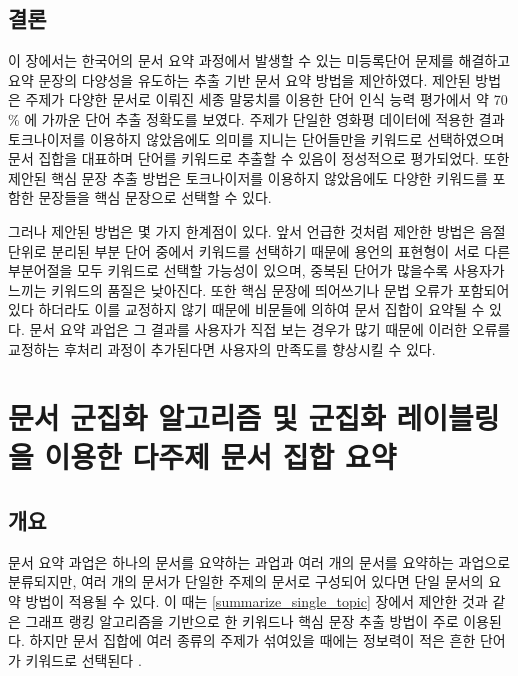 \documentclass[11pt]{article}
\begin{document}
\subsection{결론}

이 장에서는 한국어의 문서 요약 과정에서 발생할 수 있는 미등록단어 문제를 해결하고 요약 문장의 다양성을 유도하는 추출 기반 문서 요약 방법을 제안하였다.
제안된 방법은 주제가 다양한 문서로 이뤄진 세종 말뭉치를 이용한 단어 인식 능력 평가에서 약 70 \% 에 가까운 단어 추출 정확도를 보였다.
주제가 단일한 영화평 데이터에 적용한 결과 토크나이저를 이용하지 않았음에도 의미를 지니는 단어들만을 키워드로 선택하였으며 문서 집합을 대표하며 단어를 키워드로 추출할 수 있음이 정성적으로 평가되었다.
또한 제안된 핵심 문장 추출 방법은 토크나이저를 이용하지 않았음에도 다양한 키워드를 포함한 문장들을 핵심 문장으로 선택할 수 있다.

그러나 제안된 방법은 몇 가지 한계점이 있다.
앞서 언급한 것처럼 제안한 방법은 음절 단위로 분리된 부분 단어 중에서 키워드를 선택하기 때문에 용언의 표현형이 서로 다른 부분어절을 모두 키워드로 선택할 가능성이 있으며, 중복된 단어가 많을수록 사용자가 느끼는 키워드의 품질은 낮아진다.
또한 핵심 문장에 띄어쓰기나 문법 오류가 포함되어 있다 하더라도 이를 교정하지 않기 때문에 비문들에 의하여 문서 집합이 요약될 수 있다.
문서 요약 과업은 그 결과를 사용자가 직접 보는 경우가 많기 때문에 이러한 오류를 교정하는 후처리 과정이 추가된다면 사용자의 만족도를 향상시킬 수 있다.


\newpage
\section{문서 군집화 알고리즘 및 군집화 레이블링을 이용한 다주제 문서 집합 요약} \label{improved_kmeans}

\subsection{개요}

문서 요약 과업은 하나의 문서를 요약하는 과업과 여러 개의 문서를 요약하는 과업으로 분류되지만, 여러 개의 문서가 단일한 주제의 문서로 구성되어 있다면 단일 문서의 요약 방법이 적용될 수 있다.
이 때는 \ref{summarize_single_topic} 장에서 제안한 것과 같은 그래프 랭킹 알고리즘을 기반으로 한 키워드나 핵심 문장 추출 방법이 주로 이용된다.
하지만 문서 집합에 여러 종류의 주제가 섞여있을 때에는 정보력이 적은 흔한 단어가 키워드로 선택된다 \citep{goldstein2000multi, lin2002single, filippova2008sentence, filippova2010multi}.
\end{document}
